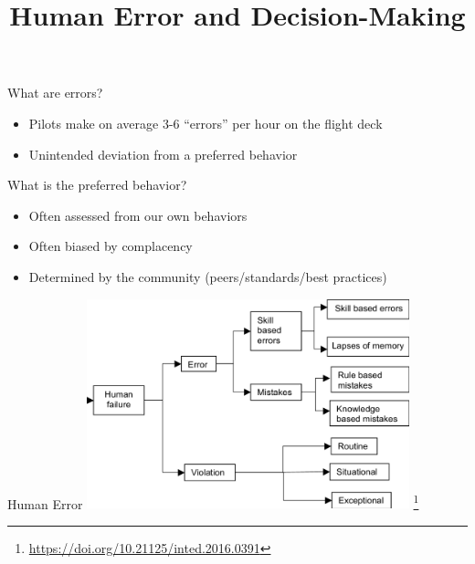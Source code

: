 \documentclass[aspectratio=169,notes]{beamer}
\title{Human Error and Decision-Making}
\institute{Engineers for Exploration, UC San Diego}
\begin{document}
\maketitle
\begin{frame}{What are errors?}
    \begin{itemize}
        \item Pilots make on average 3-6 ``errors'' per hour on the flight deck
        \item Unintended deviation from a preferred behavior
    \end{itemize}
\end{frame}
\begin{frame}{What is the preferred behavior?}
    \begin{itemize}
        \item Often assessed from our own behaviors
        \item Often biased by complacency
        \item Determined by the community (peers/standards/best practices)
    \end{itemize}
\end{frame}
\begin{frame}{Human Error}
    \centering
    \includegraphics[width=0.7\textwidth]{types_of_human_failure.png} \footnote{\url{https://doi.org/10.21125/inted.2016.0391}}
\end{frame}
\end{document}
